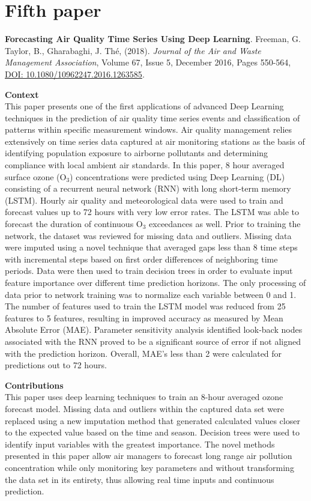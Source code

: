 \section{Fifth paper}
\noindent
\textbf{Forecasting Air Quality Time Series Using Deep Learning}. Freeman, G. Taylor, B., Gharabaghi, J.  Th\'e, (2018).  \textit{Journal of the Air and Waste Management Association}, Volume 67, Issue 5, December 2016, Pages 550-564, \url{DOI: 10.1080/10962247.2016.1263585}.

\vspace{5mm}
\noindent
\textbf{Context}\\
\noindent
This paper presents one of the first applications of advanced Deep Learning techniques in the prediction of air quality time series events and classification of patterns within specific measurement windows. Air quality management relies extensively on time series data captured at air monitoring stations as the basis of identifying population exposure to airborne pollutants and determining compliance with local ambient air standards. In this paper, 8 hour averaged surface ozone (O$_{3}$) concentrations were predicted using Deep Learning (DL) consisting of a recurrent neural network (RNN) with long short-term memory (LSTM). Hourly air quality and meteorological data were used to train and forecast values up to 72 hours with very low error rates. The LSTM was able to forecast the duration of continuous O$_{3}$ exceedances as well. Prior to training the network, the dataset was reviewed for missing data and outliers. Missing data were imputed using a novel technique that averaged gaps less than 8 time steps with incremental steps based on first order differences of neighboring time periods. Data were then used to train decision trees in order to evaluate input feature importance over different time prediction horizons. The only processing of data prior to network training was to normalize each variable between 0 and 1. The number of features used to train the LSTM model was reduced from 25 features to 5 features, resulting in improved accuracy as measured by Mean Absolute Error (MAE). Parameter sensitivity analysis identified look-back nodes associated with the RNN proved to be a significant source of error if not aligned with the prediction horizon. Overall, MAE's less than 2 were calculated for predictions out to 72 hours. 

\vspace{5mm}
\noindent
\textbf{Contributions}\\
\noindent
This paper uses deep learning techniques to train an 8-hour averaged ozone forecast model. Missing data and outliers within the captured data set were replaced using a new imputation method that generated calculated values closer to the expected value based on the time and season. Decision trees were used to identify input variables with the greatest importance. The novel methods presented in this paper allow air managers to forecast long range air pollution concentration while only monitoring key parameters and without transforming the data set in its entirety, thus allowing real time inputs and continuous prediction.

